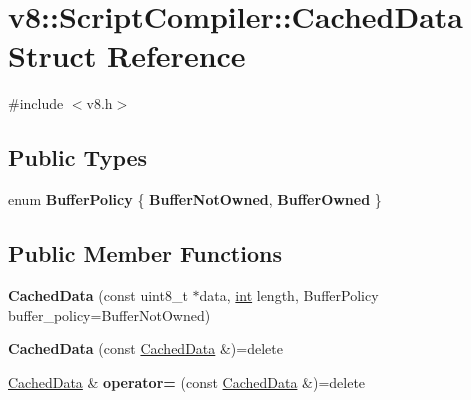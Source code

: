 \hypertarget{structv8_1_1ScriptCompiler_1_1CachedData}{}\section{v8\+:\+:Script\+Compiler\+:\+:Cached\+Data Struct Reference}
\label{structv8_1_1ScriptCompiler_1_1CachedData}


{\ttfamily \#include $<$v8.\+h$>$}

\subsection*{Public Types}
\begin{DoxyCompactItemize}
\item 
\mbox{\label{structv8_1_1ScriptCompiler_1_1CachedData_ac1a1055d361e89b589c3fa98b79b9c25}} 
enum {\bfseries Buffer\+Policy} \{ {\bfseries Buffer\+Not\+Owned}, 
{\bfseries Buffer\+Owned}
 \}
\end{DoxyCompactItemize}
\subsection*{Public Member Functions}
\begin{DoxyCompactItemize}
\item 
\mbox{\label{structv8_1_1ScriptCompiler_1_1CachedData_ab45b2bd22aa86eafd0b8eecbdc72d44e}} 
{\bfseries Cached\+Data} (const uint8\+\_\+t $\ast$data, \mbox{\hyperlink{classint}{int}} length, Buffer\+Policy buffer\+\_\+policy=Buffer\+Not\+Owned)
\item 
\mbox{\label{structv8_1_1ScriptCompiler_1_1CachedData_a50459db5fa0e01db839bcf14f786fa56}} 
{\bfseries Cached\+Data} (const \mbox{\hyperlink{structv8_1_1ScriptCompiler_1_1CachedData}{Cached\+Data}} \&)=delete
\item 
\mbox{\label{structv8_1_1ScriptCompiler_1_1CachedData_a6327b06938eba983da41bb1579195442}} 
\mbox{\hyperlink{structv8_1_1ScriptCompiler_1_1CachedData}{Cached\+Data}} \& {\bfseries operator=} (const \mbox{\hyperlink{structv8_1_1ScriptCompiler_1_1CachedData}{Cached\+Data}} \&)=delete
\end{DoxyCompactItemize}
